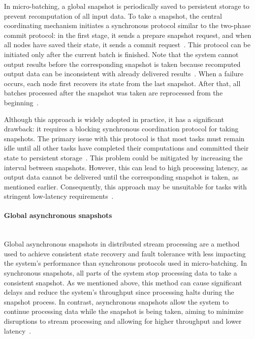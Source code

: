 In micro-batching, a global snapshot is periodically saved to persistent storage to prevent recomputation of all input data. To take a snapshot, the central coordinating mechanism initiates a synchronous protocol similar to the two-phase commit protocol: in the first stage, it sends a prepare snapshot request, and when all nodes have saved their state, it sends a commit request~\cite{carbone2018scalable}. This protocol can be initiated only after the current batch is finished. Note that the system cannot output results before the corresponding snapshot is taken because recomputed output data can be inconsistent with already delivered results~\cite{carbone2018scalable, thepaper}. When a failure occurs, each node first recovers its state from the last snapshot. After that, all batches processed after the snapshot was taken are reprocessed from the beginning~\cite{Zaharia:2012:DSE:2342763.2342773}.

Although this approach is widely adopted in practice, it has a significant drawback: it requires a blocking synchronous coordination protocol for taking snapshots. The primary issue with this protocol is that most tasks must remain idle until all other tasks have completed their computations and committed their state to persistent storage~\cite{carbone2018scalable, thepaper}. This problem could be mitigated by increasing the interval between snapshots. However, this can lead to high processing latency, as output data cannot be delivered until the corresponding snapshot is taken, as mentioned earlier. Consequently, this approach may be unsuitable for tasks with stringent low-latency requirements~\cite{carbone2018scalable}.

\paragraph{Global asynchronous snapshots} \mbox{} \\

Global asynchronous snapshots in distributed stream processing are a method used to achieve consistent state recovery and fault tolerance with less impacting the system's performance than synchronous protocols used in micro-batching. In synchronous snapshots, all parts of the system stop processing data to take a consistent snapshot. As we mentioned above, this method can cause significant delays and reduce the system's throughput since processing halts during the snapshot process. In contrast, asynchronous snapshots allow the system to continue processing data while the snapshot is being taken, aiming to minimize disruptions to stream processing and allowing for higher throughput and lower latency~\cite{2015arXiv150608603C, Carbone:2017:SMA:3137765.3137777}.

